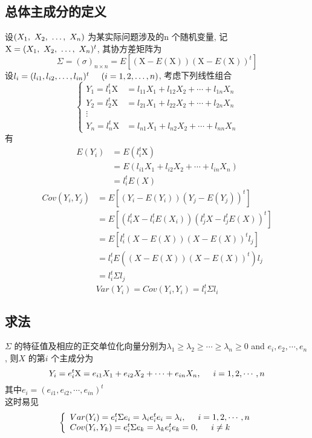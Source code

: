 \documentclass{article}
\begin{document}
\subsection{总体主成分的定义}
设$(X_1,~X_2,~\ldots,~X_n)$ 为某实际问题涉及的n 个随机变量, 记$\mathrm{X} = (X_1,~X_2,~\ldots,~X_n)^t$, 其协方差矩阵为
$$
\Sigma = (\sigma)_{n \times n} = E[(\mathrm{X} - E(\mathrm{X}))(\mathrm{X} - E(\mathrm{X}))^t]
$$
设$l_i = (l_{i1},l_{i2},\dots,l_{in})^t \hspace{0.5cm} (i=1,2,\dots,n)$, 考虑下列线性组合
$$
\left\{
  \begin{array}{ll}
	  Y_1 = l_1^t \mathrm{X} & = l_{11}X_1 + l_{12}X_2 + \cdots + l_{1n}X_n \\
	  Y_2 = l_2^t \mathrm{X} & = l_{21}X_1 + l_{22}X_2 + \cdots + l_{2n}X_n \\
		  \vdots\\
	  Y_n = l_n^t \mathrm{X} & = l_{n1}X_1 + l_{n2}X_2 + \cdots + l_{nn}X_n
  \end{array}
\right.
$$
有
$$
\begin{aligned}
E(Y_i)
& = E(l_i^t \mathrm{X}) \\
& = E(l_{i1}X_1 + l_{i2}X_2 + \cdots + l_{in}X_n) \\
& = l_{i}^t E(X)
\end{aligned}
$$
$$
\begin{aligned}
Cov(Y_i,Y_j)
& = E[(Y_i - E(Y_i))(Y_j - E(Y_j))^t] \\
& = E[(l_i^tX - l_i^tE(X_i))(l_j^tX - l_j^tE(X))^t] \\
& = E[l_i^t (X-E(X)) (X-E(X))^t l_j]\\
& = l_i^t E((X-E(X))(X-E(X))^t) l_j \\
& = l_i^t \Sigma l_j
\end{aligned}
$$
$$Var(Y_i) = Cov(Y_i,Y_i) = l_i^t \Sigma l_i$$

\subsection{求法}
$\Sigma$ 的特征值及相应的正交单位化向量分别为$\lambda_1 \geq \lambda_2 \geq \cdots \geq \lambda_n \geq 0$ and $e_i,e_2,\cdots,e_n$, 则$X$ 的第$i$ 个主成分为
$$ Y_i = e_i^t \mathrm{X} = e_{i1}X_1 + e_{i2}X_2 + \cdots + e_{in}X_n, \hspace{0.5cm} i=1,2,\cdots,n $$
其中$e_i = (e_{i1}, e_{i2}, \cdots, e_{in})^t $\\
这时易见
$$
\left\{
	\begin{array}{l}
		Var(Y_i) = e_i^t \Sigma e_i = \lambda_i e_i^t e_i = \lambda_i, \hspace{0.5cm} i = 1,2,\cdots,n\\
		Cov(Y_i,Y_k) = e_i^t \Sigma e_k = \lambda_k e_i^t e_k = 0, \hspace{0.5cm} i \neq k
	\end{array}
\right.
$$
\end{document}
